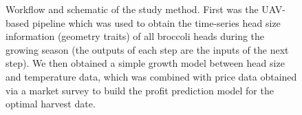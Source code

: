 \begin{figure}[htb]
  \begin{center}
  \end{center}
  \caption[Workflow and schematic of the study method]{
    Workflow and schematic of the study method. First was the UAV-based pipeline which was used to obtain the time-series head size information (geometry traits) of all broccoli heads during the growing season (the outputs of each step are the inputs of the next step). We then obtained a simple growth model between head size and temperature data, which was combined with price data obtained via a market survey to build the profit prediction model for the optimal harvest date.
  }
  \label{fig:bro4}
\end{figure}